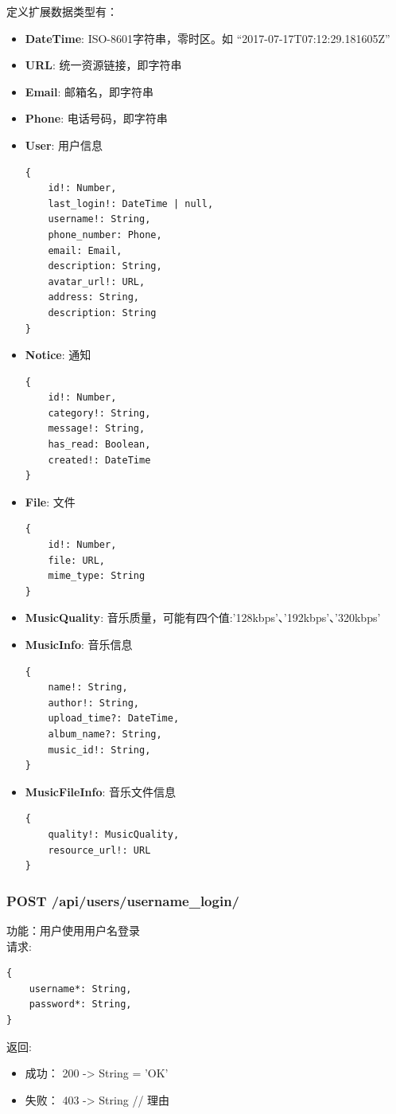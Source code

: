 定义扩展数据类型有：
\begin{itemize}
	\item \textbf{DateTime}: ISO-8601字符串，零时区。如 “2017-07-17T07:12:29.181605Z”
	\item \textbf{URL}: 统一资源链接，即字符串
	\item \textbf{Email}: 邮箱名，即字符串
	\item \textbf{Phone}: 电话号码，即字符串
	\item \textbf{User}: 用户信息
\begin{lstlisting}[numbers=none, frame=none]
{
    id!: Number,
    last_login!: DateTime | null,
    username!: String,
    phone_number: Phone,
    email: Email,
    description: String,
    avatar_url!: URL,
    address: String,
    description: String
}
\end{lstlisting}
	\item \textbf{Notice}: 通知
\begin{lstlisting}[numbers=none, frame=none]
{
    id!: Number,
    category!: String,
  	message!: String,
  	has_read: Boolean,
  	created!: DateTime
}
\end{lstlisting}
	\item \textbf{File}: 文件
\begin{lstlisting}[numbers=none, frame=none]
{
    id!: Number,
    file: URL,
    mime_type: String
}
\end{lstlisting}
\item \textbf{MusicQuality}: 音乐质量，可能有四个值:'128kbps'、'192kbps'、'320kbps'
\item \textbf{MusicInfo}: 音乐信息
\begin{lstlisting}[numbers=none, frame=none]
{
    name!: String,
    author!: String,
    upload_time?: DateTime,
    album_name?: String,
    music_id!: String,
}
\end{lstlisting}
\item \textbf{MusicFileInfo}: 音乐文件信息
\begin{lstlisting}[numbers=none, frame=none]
{
    quality!: MusicQuality,
    resource_url!: URL
}
\end{lstlisting}
\end{itemize}


\subsubsection{POST /api/users/username\_login/}

\noindent
功能：用户使用用户名登录\\
请求:
\begin{lstlisting}[numbers=none, frame=none]
{
    username*: String,
    password*: String,
}
\end{lstlisting}
返回:
\begin{itemize}
	\item 成功： 200 -> String = 'OK'
	\item 失败： 403 -> String // 理由
\end{itemize}

